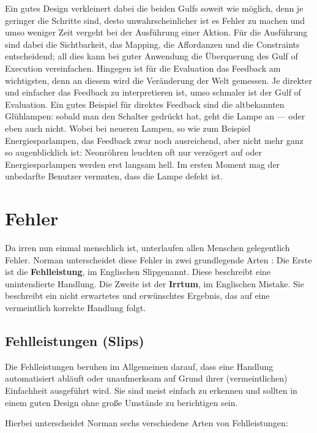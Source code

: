 \documentclass[parskip,headsepline, headtopline, %
footsepline, oneside, 12pt, headings=small]{scrreprt}
\begin{document}
Ein gutes Design verkleinert dabei die beiden Gulfs soweit wie möglich, denn je geringer die Schritte sind, desto unwahrscheinlicher ist es Fehler zu machen und umso weniger Zeit vergeht bei der Ausführung einer Aktion. Für die Ausführung sind dabei die Sichtbarkeit, das Mapping, die Affordanzen und die Constraints entscheidend; all dies kann bei guter Anwendung die Überquerung des Gulf of Execution vereinfachen. Hingegen ist für die Evaluation das Feedback am wichtigsten, denn an diesem wird die Veränderung der Welt gemessen. Je direkter und einfacher das Feedback zu interpretieren ist, umso schmaler ist der Gulf of Evaluation. Ein gutes Beispiel für direktes Feedback sind die altbekannten Glühlampen: sobald man den Schalter gedrückt hat, geht die Lampe an --- oder eben auch nicht. Wobei bei neueren Lampen, so wie zum Beispiel Energiesparlampen, das Feedback zwar noch ausreichend, aber nicht mehr ganz so augenblicklich ist: Neonröhren leuchten oft nur verzögert auf oder Energiesparlampen werden erst langsam hell. Im ersten Moment mag der unbedarfte Benutzer vermuten, dass die Lampe defekt ist. 

\section{Fehler}

Da irren nun einmal menschlich ist, unterlaufen allen Menschen gelegentlich Fehler. Norman unterscheidet diese Fehler in zwei grundlegende Arten \cite[S. 105]{don}: Die Erste ist die \textbf{Fehlleistung}, im Englischen \glqq Slip\grqq  genannt. Diese beschreibt eine unintendierte Handlung. Die Zweite ist der \textbf{Irrtum}, im Englischen \glqq Mistake\grqq. Sie beschreibt ein nicht erwartetes und erwünschtes Ergebnis, das auf eine vermeintlich korrekte Handlung folgt.

\subsection{Fehlleistungen (Slips)}

Die Fehlleistungen beruhen im Allgemeinen darauf, dass eine Handlung automatisiert abläuft oder unaufmerksam auf Grund ihrer (vermeintlichen) Einfachheit ausgeführt wird. Sie sind meist einfach zu erkennen und sollten in einem guten Design ohne große Umstände zu berichtigen sein.

Hierbei unterscheidet Norman sechs verschiedene Arten von Fehlleistungen\cite[S. 107]{don}:
\end{document}
